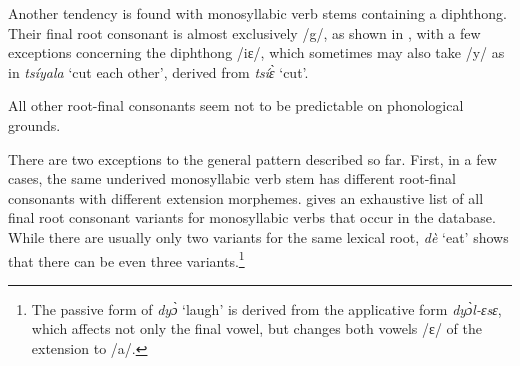 Another tendency is found with monosyllabic verb stems containing a diphthong. Their final root consonant is almost exclusively /g/, as shown in , with a few exceptions concerning the diphthong /iɛ/, which sometimes may also take /y/ as in {\itshape tsíyala} `cut each other', derived from {\itshape tsíɛ̀} `cut'.



All other root-final consonants seem not to be predictable on phonological grounds.


There are two exceptions to the general pattern described so far. First, in a few cases, the same underived monosyllabic verb stem has different root-final consonants with different extension morphemes.   gives an exhaustive list of all final root consonant variants for monosyllabic verbs that occur in the database. While there are usually only two variants for the same lexical root, {\itshape dè} `eat' shows that there can be even three variants.\footnote{The passive form of {\itshape dyɔ̀} `laugh' is derived from the applicative form {\itshape dyɔ̀l-ɛsɛ}, which affects not only the final vowel, but changes both vowels /ɛ/ of the extension to /a/.} 

